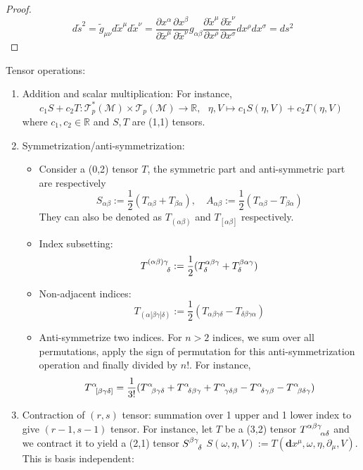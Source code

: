 \documentclass[a4paper]{article}
\theoremstyle{new}
\begin{document}
\begin{proof}
$$d\tilde{s}^2=\tilde{g}_{\mu\nu}d\tilde{x}^\mu d\tilde{x}^\nu=\frac{\partial x^\alpha}{\partial\tilde{x}^\mu}\frac{\partial x^\beta}{\partial\tilde{x}^\nu}g_{\alpha\beta}\frac{\partial\tilde{x}^\mu}{\partial x^\rho}\frac{\partial\tilde{x}^\nu}{\partial x^\sigma}dx^\rho dx^\sigma=ds^2$$
\end{proof}
Tensor operations:
\begin{enumerate}
    \item Addition and scalar multiplication: For instance,
    $$c_1S+c_2T:\mathcal{T}_p^*(\mathcal{M})\times \mathcal{T}_p(\mathcal{M})\rightarrow\mathbb{R},\text{  }\eta,V\mapsto c_1S(\eta,V)+c_2T(\eta,V)$$
    where $c_1,c_2\in\mathbb{R}$ and $S,T$ are (1,1) tensors.
    \item Symmetrization/anti-symmetrization:
    \begin{itemize}
        \item Consider a (0,2) tensor $T$, the symmetric part and anti-symmetric part are respectively
        $$S_{\alpha\beta}:=\frac{1}{2}(T_{\alpha\beta}+T_{\beta\alpha}),\quad A_{\alpha\beta}:=\frac{1}{2}(T_{\alpha\beta}-T_{\beta\alpha})$$
        They can also be denoted as $T_{(\alpha\beta)}$ and $T_{[\alpha\beta]}$ respectively.
        \item Index subsetting:
        $$\tensor*{T}{*_{}^{(\alpha\beta)\gamma}_{\delta}}:=\frac{1}{2}(T^{\alpha\beta\gamma}_\delta+T^{\beta\alpha\gamma}_\delta)$$
        \item Non-adjacent indices:
        $$T_{(\alpha|\beta\gamma|\delta)}:=\frac{1}{2}(T_{\alpha\beta\gamma\delta}-T_{\delta\beta\gamma\alpha})$$
        \item Anti-symmetrize two indices. For $n>2$ indices, we sum over all permutations, apply the sign of permutation for this anti-symmetrization operation and finally divided by $n!$. For instance,
        $$\tensor*{T}{*_{}^{\alpha}_{[\beta\gamma\delta]}}=\frac{1}{3!}(\tensor*{T}{*_{}^{\alpha}_{\beta\gamma\delta}}+\tensor*{T}{*_{}^{\alpha}_{\delta\beta\gamma}}+\tensor*{T}{*_{}^{\alpha}_{\gamma\delta\beta}}-\tensor*{T}{*_{}^{\alpha}_{\delta\gamma\beta}}-\tensor*{T}{*_{}^{\alpha}_{\beta\delta\gamma}})$$
    \end{itemize}
    \item Contraction of $(r,s)$ tensor: summation over 1 upper and 1 lower index to give $(r-1,s-1)$ tensor. For instance, let $T$ be a (3,2) tensor $\tensor*{T}{*_{}^{\alpha\beta\gamma}_{\alpha\delta}}$ and we contract it to yield a (2,1) tensor $\tensor*{S}{*_{}^{\beta\gamma}_{\delta}}$  $S(\omega,\eta,V):=T(\mathbf{d}x^\mu,\omega,\eta,\partial_\mu,V)$. This is basis independent:

\end{enumerate}
\end{document}
